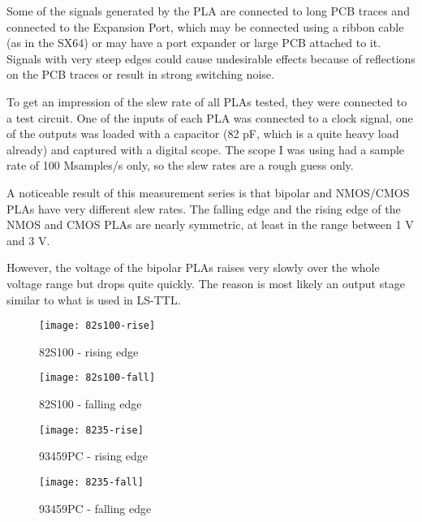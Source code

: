 Some of the signals generated by the PLA are connected to long PCB traces
and connected to the Expansion Port, which may be connected using a ribbon
cable (as in the SX64) or may have a port expander or large PCB attached to
it. Signals with very steep edges could cause undesirable effects because of
reflections on the PCB traces or result in strong switching noise.

To get an impression of the slew rate of all PLAs tested, they were
connected to a test circuit. One of the inputs of each PLA was connected to
a clock signal, one of the outputs was loaded with a capacitor (82 pF, which is
a quite heavy load already) and captured with a digital scope. The scope I was
using had a sample rate of 100 Msamples/s only, so the slew rates are a rough
guess only.

A noticeable result of this measurement series is that bipolar and NMOS/CMOS
PLAs have very different slew rates. The falling edge and the rising edge of
the NMOS and CMOS PLAs are nearly symmetric, at least in the range between 1
V and 3 V.

However, the voltage of the bipolar PLAs raises very slowly over the whole
voltage range but drops quite quickly. The reason is most likely an output
stage similar to what is used in LS-TTL.

\begin{figure}
    \begin{minipage}{0.45\linewidth}
        \centering
        \texttt{[image: 82s100-rise]}
        \caption{82S100 - rising edge}
        \label{fig:82S100-rise}
    \end{minipage}
    \hfill
    \begin{minipage}{0.45\linewidth}
        \centering
        \texttt{[image: 82s100-fall]}
        \caption{82S100 - falling edge}
        \label{fig:82S100-fall}
    \end{minipage}
\end{figure}

\begin{figure}
    \begin{minipage}{0.45\linewidth}
        \centering
        \texttt{[image: 8235-rise]}
        \caption{93459PC - rising edge}
        \label{fig:93459PC-rise}
    \end{minipage}
    \hfill
    \begin{minipage}{0.45\linewidth}
        \centering
        \texttt{[image: 8235-fall]}
        \caption{93459PC - falling edge}
        \label{fig:93459PC-fall}
    \end{minipage}
\end{figure}

